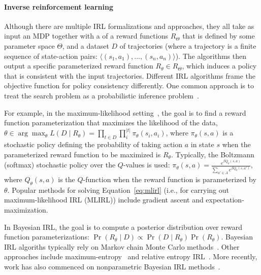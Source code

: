 
\vspace{\up}
\paragraph{Inverse reinforcement learning}

Although there are multiple IRL formalizations and approaches, they
all take as input an MDP together with a  of a reward
functions $R_\Theta$ that is defined by some parameter space $\Theta$,
and a dataset $D$ of trajectories (where a trajectory is a finite
sequence of state-action pairs: $\langle (s_1, a_1), ..., (s_n, a_n)
\rangle$). The algorithms then output a specific parameterized reward
function $R_\theta \in R_\Theta$, which induces a policy that is
consistent with the input trajectories.
%
Different IRL algorithms frame the objective function for policy
consistency differently. One common approach is to treat the
search problem as a probabilistic inference
problem~\cite{babes11,lopes2009active,ramachandran2007bayesian,ziebart2008maximum}. 

For example, in the maximum-likelihood setting~\cite{babes11}, the
goal is to find a reward function parameterization that maximizes
the likelihood of the data,
%
$\theta \in \arg\max_{\theta} L(D \mid R_{\theta}) = \prod_{t \in D} \prod_i^{|t|} \pi_{\theta}(s_i, a_i)$,
%
where $\pi_{\theta}(s, a)$ is a stochastic policy defining the
probability of taking action $a$ in state $s$ when the parameterized
reward function to be maximized is $R_{\theta}$. Typically, the
Boltzmann (softmax) stochastic policy over the $Q$-values is used:
$\pi_{\theta}(s, a) = \frac{e^{\beta Q_{\theta}(s,a)}}{\sum_{a' \in A}
  e^{\beta Q_{\theta}(s,a')}}$, where $Q_\theta(s, a)$ is the $Q$-function
when the reward function is parameterized by $\theta$.
%
Popular methods for solving Equation~\ref{eq:mlirl} (i.e., for
carrying out maximum-likelihood IRL (MLIRL)) include gradient ascent
and expectation-maximization.

In Bayesian IRL, the goal is to compute a posterior distribution over
reward function parameterizations:
%
$\Pr(R_{\theta} \mid D) \propto \Pr(D \mid R_{\theta}) \Pr(R_\theta)$.
%
Bayesian IRL algoriths typically rely on Markov chain Monte Carlo
methods~\cite{journals/corr/abs-1208-2112,ramachandran2007bayesian}.
%
Other approaches include maximum-entropy~\cite{ziebart2008maximum}
and relative entropy IRL~\cite{BoulariasKP2011}. 
%
More recently, work has also commenced on
nonparametric Bayesian IRL methods~\cite{Choi:2012:NBI:2999134.2999169,Michini2012}.

